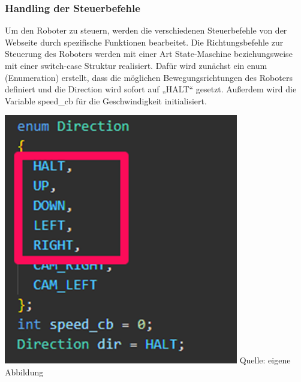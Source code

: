 \documentclass[ngerman,12pt,a4paper]{article}
\begin{document}
	\subsubsection{Handling der Steuerbefehle}
	Um den Roboter zu steuern, werden die verschiedenen Steuerbefehle von der Webseite durch spezifische Funktionen bearbeitet. Die Richtungsbefehle zur Steuerung des Roboters werden mit einer Art State-Maschine beziehungsweise mit einer switch-case Struktur realisiert. Dafür wird zunächst ein enum (Enumeration) erstellt, dass die möglichen Bewegungsrichtungen des Roboters definiert und die Direction wird sofort auf „HALT“ gesetzt. Außerdem wird die Variable speed\_cb für die Geschwindigkeit initialisiert. \\[0.5cm]
	\begin{minipage}{\textwidth}
		\centering
		\includegraphics[scale=1.05]{Pictures/code_enum_motoren}
		\label{fig:code_enum_motoren}
		\vspace{-2pt}
		\small Quelle: eigene Abbildung
		\vspace{10pt}
	\end{minipage}	
\end{document}
